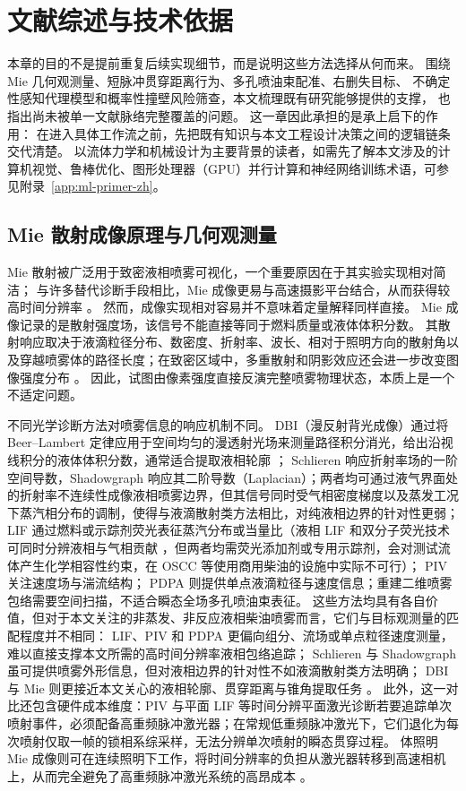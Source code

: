 \section{文献综述与技术依据}

本章的目的不是提前重复后续实现细节，而是说明这些方法选择从何而来。
围绕 Mie 几何观测量、短脉冲贯穿距离行为、多孔喷油束配准、右删失目标、
不确定性感知代理模型和概率性撞壁风险筛查，本文梳理既有研究能够提供的支撑，
也指出尚未被单一文献脉络完整覆盖的问题。
这一章因此承担的是承上启下的作用：
在进入具体工作流之前，先把既有知识与本文工程设计决策之间的逻辑链条交代清楚。
以流体力学和机械设计为主要背景的读者，如需先了解本文涉及的计算机视觉、鲁棒优化、图形处理器（GPU）并行计算和神经网络训练术语，可参见附录~\ref{app:ml-primer-zh}。

\subsection{Mie 散射成像原理与几何观测量}

Mie 散射被广泛用于致密液相喷雾可视化，一个重要原因在于其实验实现相对简洁；
与许多替代诊断手段相比，Mie 成像更易与高速摄影平台结合，从而获得较高时间分辨率 \cite{Linne2013SprayImaging}。
然而，成像实现相对容易并不意味着定量解释同样直接。
Mie 成像记录的是散射强度场，该信号不能直接等同于燃料质量或液体体积分数。
其散射响应取决于液滴粒径分布、数密度、折射率、波长、相对于照明方向的散射角以及穿越喷雾体的路径长度；在致密区域中，多重散射和阴影效应还会进一步改变图像强度分布 \cite{BohrenHuffman2004,Linne2013SprayImaging}。
因此，试图由像素强度直接反演完整喷雾物理状态，本质上是一个不适定问题。

不同光学诊断方法对喷雾信息的响应机制不同。
DBI（漫反射背光成像）通过将 Beer--Lambert 定律应用于空间均匀的漫透射光场来测量路径积分消光，给出沿视线积分的液体体积分数，通常适合提取液相轮廓 \cite{Pickett2011DBISAEref}；
Schlieren 响应折射率场的一阶空间导数，Shadowgraph 响应其二阶导数（Laplacian）；两者均可通过液气界面处的折射率不连续性成像液相喷雾边界，但其信号同时受气相密度梯度以及蒸发工况下蒸汽相分布的调制，使得与液滴散射类方法相比，对纯液相边界的针对性更弱；
LIF 通过燃料或示踪剂荧光表征蒸汽分布或当量比（液相 LIF 和双分子荧光技术可同时分辨液相与气相贡献 \cite{Suzuki1993}，但两者均需荧光添加剂或专用示踪剂，会对测试流体产生化学相容性约束，在 OSCC 等使用商用柴油的设施中实际不可行）；
PIV 关注速度场与湍流结构；
PDPA 则提供单点液滴粒径与速度信息；重建二维喷雾包络需要空间扫描，不适合瞬态全场多孔喷油束表征。
这些方法均具有各自价值，但对于本文关注的非蒸发、非反应液相柴油喷雾而言，它们与目标观测量的匹配程度并不相同：
LIF、PIV 和 PDPA 更偏向组分、流场或单点粒径速度测量，难以直接支撑本文所需的高时间分辨率液相包络追踪；
Schlieren 与 Shadowgraph 虽可提供喷雾外形信息，但对液相边界的针对性不如液滴散射类方法明确；
DBI 与 Mie 则更接近本文关心的液相轮廓、贯穿距离与锥角提取任务 \cite{Linne2013SprayImaging}。
此外，这一对比还包含硬件成本维度：PIV 与平面 LIF 等时间分辨平面激光诊断若要追踪单次喷射事件，必须配备高重频脉冲激光器；在常规低重频脉冲激光下，它们退化为每次喷射仅取一帧的锁相系综采样，无法分辨单次喷射的瞬态贯穿过程。
体照明 Mie 成像则可在连续照明下工作，将时间分辨率的负担从激光器转移到高速相机上，从而完全避免了高重频脉冲激光系统的高昂成本 \cite{Linne2013SprayImaging}。


